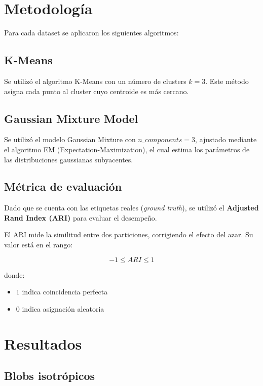 \documentclass[12pt]{article}
\begin{document}
\section{Metodología}

Para cada dataset se aplicaron los siguientes algoritmos:

\subsection{K-Means}

Se utilizó el algoritmo K-Means con un número de clusters $k = 3$. Este método asigna cada punto al cluster cuyo centroide es más cercano.

\subsection{Gaussian Mixture Model}

Se utilizó el modelo Gaussian Mixture con $n\_components = 3$, ajustado mediante el algoritmo EM (Expectation-Maximization), el cual estima los parámetros de las distribuciones gaussianas subyacentes.

\subsection{Métrica de evaluación}

Dado que se cuenta con las etiquetas reales (\textit{ground truth}), se utilizó el \textbf{Adjusted Rand Index (ARI)} para evaluar el desempeño.

El ARI mide la similitud entre dos particiones, corrigiendo el efecto del azar. Su valor está en el rango:

\[
-1 \leq ARI \leq 1
\]

donde:
\begin{itemize}
    \item $1$ indica coincidencia perfecta
    \item $0$ indica asignación aleatoria
\end{itemize}

\section{Resultados}

\subsection{Blobs isotrópicos}
\end{document}
